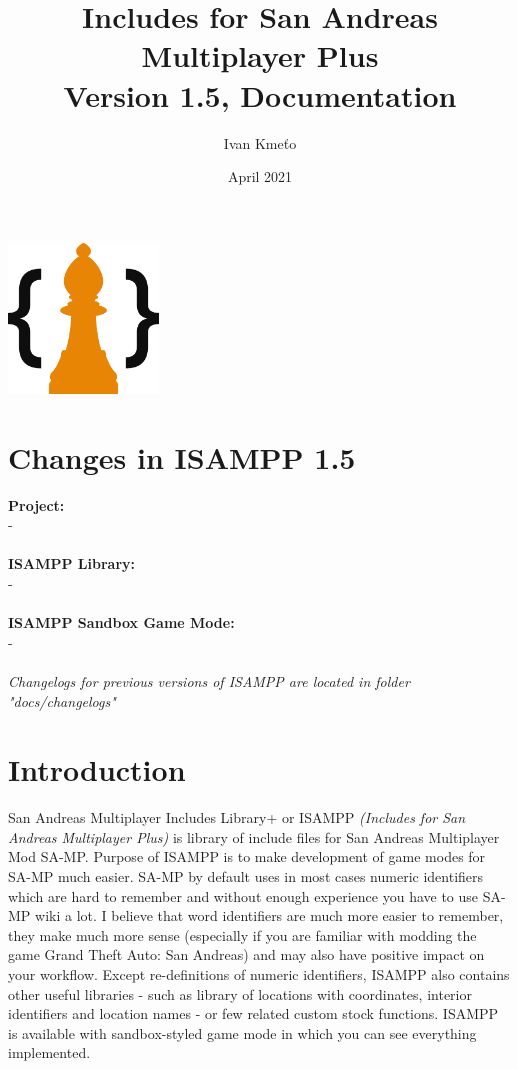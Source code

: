\documentclass{article}
\title{Includes for San Andreas Multiplayer Plus\\Version 1.5, Documentation}
\author{Ivan Kmeťo}
\date{April 2021}
\begin{document}
\maketitle
\begin{center}
\includegraphics[width = 40mm]{logo/isampp_logo_big.png}
\end{center}

\newpage
\tableofcontents

\newpage
\section{Changes in ISAMPP 1.5}
\textbf{Project:}
\\- 
\\
\\
\textbf{ISAMPP Library:}
\\- 
\\
\\
\textbf{ISAMPP Sandbox Game Mode:}
\\- 
\\
\\\textit{Changelogs for previous versions of ISAMPP are located in folder "docs/changelogs"}

\newpage
\section{Introduction}
San Andreas Multiplayer Includes Library+ or ISAMPP \textit{(Includes for San Andreas Multiplayer Plus)} is library of include files for San Andreas Multiplayer Mod SA-MP. Purpose of ISAMPP is to make development of game modes for SA-MP much easier. SA-MP by default uses in most cases numeric identifiers which are hard to remember and without enough experience you have to use SA-MP wiki a lot. I believe that word identifiers are much more easier to remember, they make much more sense (especially if you are familiar with modding the game Grand Theft Auto: San Andreas) and may also have positive impact on your workflow. Except re-definitions of numeric identifiers, ISAMPP also contains other useful libraries - such as library of locations with coordinates, interior identifiers and location names - or few related custom stock functions. ISAMPP is available with sandbox-styled game mode in which you can see everything implemented.
\end{document}
